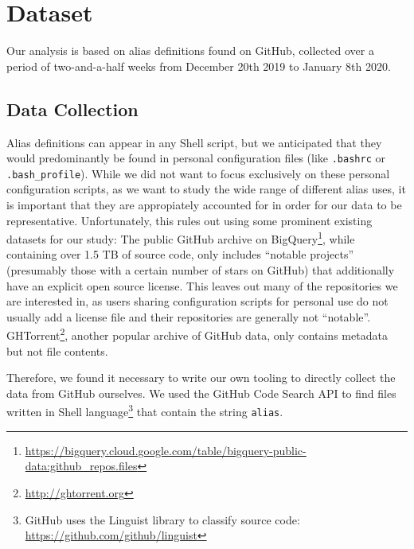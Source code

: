 \section{Dataset}

Our analysis is based on  alias definitions found on GitHub, collected over a period of two-and-a-half weeks from December 20th 2019 to January 8th 2020.

\subsection{Data Collection}

Alias definitions can appear in any Shell script, but we anticipated that they would predominantly be found in personal configuration files (like \verb|.bashrc| or \verb|.bash_profile|).
While we did not want to focus exclusively on these personal configuration scripts, as we want to study the wide range of different alias uses, it is important that they are appropiately accounted for in order for our data to be representative.
Unfortunately, this rules out using some prominent existing datasets for our study:
The public GitHub archive on BigQuery\footnote{\url{https://bigquery.cloud.google.com/table/bigquery-public-data:github_repos.files}}, while containing over 1.5 TB of source code, only includes ``notable projects'' (presumably those with a certain number of stars on GitHub) that additionally have an explicit open source license. 
This leaves out many of the repositories we are interested in, as users sharing configuration scripts for personal use do not usually add a license file and their repositories are generally not ``notable''.
GHTorrent\footnote{\url{http://ghtorrent.org}}, another popular archive of GitHub data, only contains metadata but not file contents.

Therefore, we found it necessary to write our own tooling to directly collect the data from GitHub ourselves.
We used the GitHub Code Search API to find files written in Shell language\footnote{GitHub uses the Linguist library to classify source code: \url{https://github.com/github/linguist}} that contain the string \verb|alias|.

